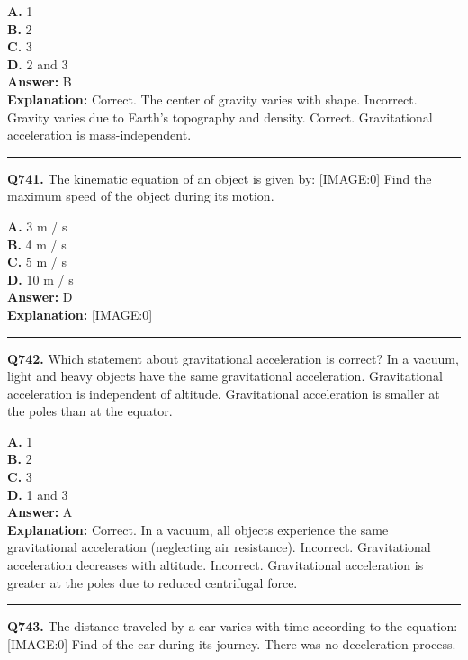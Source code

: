 \documentclass[12pt]{article}
\begin{document}
\textbf{A.} 1 \\
\textbf{B.} 2 \\
\textbf{C.} 3 \\
\textbf{D.} 2 and 3 \\

\textbf{Answer:} B \\
\textbf{Explanation:} Correct. The center of gravity varies with shape.
Incorrect. Gravity varies due to Earth’s topography and density.
Correct. Gravitational acceleration is mass-independent.

\hrule
\vspace{1em}


\noindent
\textbf{Q741.} The kinematic equation of an object is given by:
[IMAGE:0]
Find the maximum speed of the object during its motion.



\textbf{A.} 3
m
/
s \\
\textbf{B.} 4
m
/
s \\
\textbf{C.} 5
m
/
s \\
\textbf{D.} 10
m
/
s \\

\textbf{Answer:} D \\
\textbf{Explanation:} [IMAGE:0]

\hrule
\vspace{1em}


\noindent
\textbf{Q742.} Which statement about gravitational acceleration is correct?
In a vacuum, light and heavy objects have the same gravitational acceleration.
Gravitational acceleration is independent of altitude.
Gravitational acceleration is smaller at the poles than at the equator.



\textbf{A.} 1 \\
\textbf{B.} 2 \\
\textbf{C.} 3 \\
\textbf{D.} 1 and 3 \\

\textbf{Answer:} A \\
\textbf{Explanation:} Correct. In a vacuum, all objects experience the same gravitational acceleration (neglecting air resistance).
Incorrect. Gravitational acceleration decreases with altitude.
Incorrect. Gravitational acceleration is greater at the poles due to reduced centrifugal force.

\hrule
\vspace{1em}


\noindent
\textbf{Q743.} The distance traveled by a car varies with time according to the equation:
[IMAGE:0]
Find
of the car during its journey.
There was no deceleration process.
\end{document}
